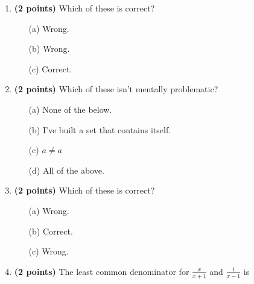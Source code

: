 \documentclass[12pt]{amsart}
\begin{document}
\newpage
\begin{enumerate}
\item {\bf (2 points)} 
 Which of these is correct?

\begin{minipage}[t]{1.0\linewidth}\begin{multicols}{3}\begin{itemize}\item[(a)]  Wrong. \item[(b)]  Wrong. \item[(c)]  Correct. \end{itemize}\end{multicols}\end{minipage} \vfill 
\item {\bf (2 points)} 
 Which of these isn't mentally problematic?

\begin{minipage}[t]{1.0\linewidth}\begin{itemize}\item[(a)]  None of the below.  \item[(b)]  I've built a set that contains itself. \item[(c)]  $a \neq a$ \item[(d)]   All of the above. \end{itemize}\end{minipage} \vfill 
\item {\bf (2 points)} 
 Which of these is correct?

\begin{minipage}[t]{1.0\linewidth}\begin{multicols}{3}\begin{itemize}\item[(a)]  Wrong. \item[(b)]  Correct. \item[(c)]  Wrong. \end{itemize}\end{multicols}\end{minipage} \vfill 
\item {\bf (2 points)} 
 The least common denominator for $\displaystyle \frac{x}{x+1}$ and $\displaystyle \frac{1}{x-1}$ is \vspace{.2cm}


\end{enumerate}
\end{document}
